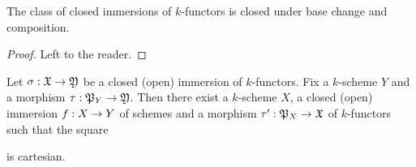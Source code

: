 \begin{fact}\label{fact:closed_immersions_closed_under_base_change_and_composition}
The class of closed immersions of $k$-functors is closed under base change and composition.
\end{fact}
\begin{proof}
Left to the reader.
\end{proof}

\begin{proposition}\label{proposition:open_closed_immersions}
Let $\sigma:{\mathfrak X}\rightarrow {\mathfrak Y}$ be a closed (open) immersion of $k$-functors. Fix a $k$-scheme $Y$ and a morphism $\tau:{\mathfrak P}_Y\rightarrow {\mathfrak Y}$. Then there exist a $k$-scheme $X$, a closed (open) immersion $f:X\rightarrow Y$ of schemes and a morphism $\tau':{\mathfrak P}_X\rightarrow {\mathfrak X}$ of $k$-functors such that the square
\begin{center}
\end{center}
is cartesian.
\end{proposition}
